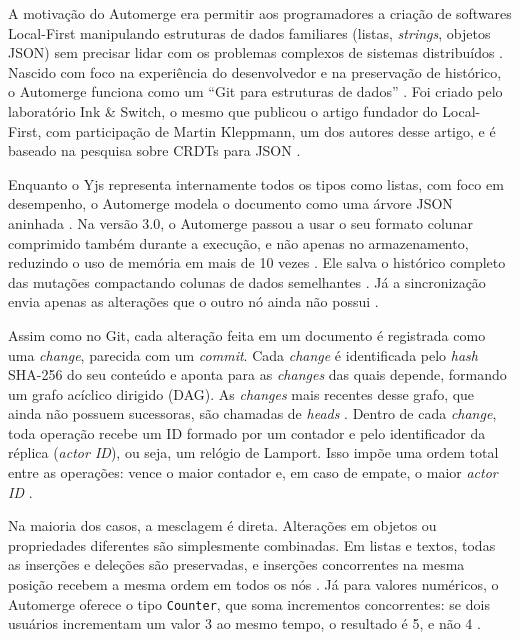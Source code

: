 A motivação do Automerge era permitir aos programadores a criação de softwares Local-First manipulando estruturas de dados familiares (listas, \textit{strings}, objetos JSON) sem precisar lidar com os problemas complexos de sistemas distribuídos \cite{automerge}. Nascido com foco na experiência do desenvolvedor e na preservação de histórico, o Automerge
funciona como um ``Git para estruturas de dados'' \cite{automerge}. Foi criado pelo laboratório Ink \& Switch, o mesmo que publicou o artigo fundador do Local-First, com participação de Martin Kleppmann, um dos autores desse artigo, e é baseado na pesquisa sobre CRDTs para JSON \cite{kleppmann2019, kleppmannberesford2017}.

Enquanto o Yjs representa internamente todos os tipos como listas, com foco em desempenho, o Automerge modela o documento como uma árvore JSON aninhada \cite{kleppmannberesford2017}. Na versão 3.0, o Automerge passou a usar o seu formato colunar comprimido também durante a execução, e não apenas no armazenamento, reduzindo o uso de memória em mais de 10 vezes \cite{automerge3}.
Ele salva o histórico completo das mutações compactando colunas de dados semelhantes \cite{automerge3}. Já a sincronização envia apenas as alterações que o outro nó ainda não possui \cite{automerge}.

Assim como no Git, cada alteração feita em um documento é registrada como uma \textit{change}, parecida com um \textit{commit}. Cada \textit{change} é identificada pelo
\textit{hash} SHA-256 do seu conteúdo e aponta para as \textit{changes} das quais depende, formando um grafo acíclico dirigido (DAG). As \textit{changes} mais recentes desse grafo,
que ainda não possuem sucessoras, são chamadas de \textit{heads} \cite{automergespec}. Dentro de cada \textit{change}, toda operação recebe um ID formado por um contador e
pelo identificador da réplica (\textit{actor ID}), ou seja, um relógio de Lamport. Isso impõe uma ordem total entre as operações: vence o maior contador e, em caso de empate,
o maior \textit{actor ID} \cite{automergespec}.

Na maioria dos casos, a mesclagem é direta. Alterações em objetos ou propriedades diferentes são simplesmente combinadas. Em listas e textos, todas as inserções e deleções
são preservadas, e inserções concorrentes na mesma posição recebem a mesma ordem em todos os nós \cite{automergeconflicts}. Já para valores numéricos, o Automerge oferece
o tipo \texttt{Counter}, que soma incrementos concorrentes: se dois usuários incrementam um valor 3 ao mesmo tempo, o resultado é 5, e não 4 \cite{automergecounters}.

